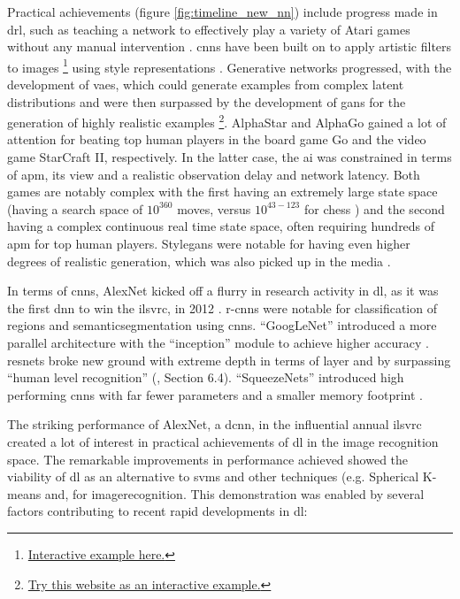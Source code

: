 Practical achievements (figure \ref{fig:timeline_new_nn}) include progress made in \gls{drl}, such as teaching a network to effectively play a variety of Atari games without any manual intervention \cite{drl_atari}. \gls{cnn}s have been built on to apply artistic filters to images \footnote{\href{https://deepart.io/}{Interactive example here.}} using style representations \cite{neural_style}. Generative networks progressed, with the development of \gls{vae}s, which could generate examples from complex latent distributions and were then surpassed by the development of \gls{gan}s for the generation of highly realistic examples \cite{gans}\footnote{\href{http://www.whichfaceisreal.com/index.php}{Try this website as an interactive example.}}. AlphaStar \cite{alphastar} and AlphaGo \cite{alphago} gained a lot of attention \cite{press_alpha_go} \cite{press_alpha_star} for beating top human players in the board game Go and the video game StarCraft II, respectively. In the latter case, the \gls{ai} was constrained in terms of \gls{apm}, its view and a realistic observation delay and network latency. Both games are notably complex with the first having an extremely large state space (having a search space of $10^{360}$ moves, versus $10^{43-123}$ for chess \cite{moves_chess_go}) and the second having a complex continuous real time state space, often requiring hundreds of \gls{apm} for top human players. Style\gls{gan}s were notable for having even higher degrees of realistic generation, which was also picked up in the media \cite{press_stylegan}.
\bigskip

In terms of \gls{cnn}s, AlexNet kicked off a flurry in research activity in \gls{dl}, as it was the first \gls{dnn} to win the \gls{ilsvrc}, in 2012 \cite{alexnet} \cite{dl_overview}. \gls{r-cnn}s were notable for classification of regions and \gls{semanticsegmentation} using \gls{cnn}s. \enquote{GoogLeNet} introduced a more parallel architecture with the \enquote{inception} module to achieve higher accuracy \cite{googlenet}. \Gls{resnet}s broke new ground with extreme depth in terms of layer \cite{resnet} and by surpassing \enquote{human level recognition} (\cite{resnet_human}, Section 6.4). \enquote{SqueezeNets} introduced high performing \gls{cnn}s with far fewer parameters and a smaller memory footprint \cite{squeeze_net}. 
\bigskip

The striking performance of AlexNet, a \gls{dcnn}, in the influential annual \gls{ilsvrc} created a lot of interest in practical achievements of \gls{dl} in the image recognition space. The remarkable improvements in performance achieved showed the viability of \gls{dl} as an alternative to \gls{svm}s and other techniques (e.g. Spherical K-means and, for \gls{imagerecognition}. This demonstration was enabled by several factors contributing to recent rapid developments in \gls{dl}: 

